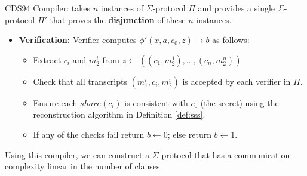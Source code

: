 \begin{protocol}[label={prot:cds-compiler}]{CDS94 Compiler: takes $n$ instances of 
    $\Sigma$-protocol $\Pi$ and provides a single $\Sigma$-protocol $\Pi'$ that proves the \textbf{disjunction} of these $n$ instances.}
\begin{itemize}
\begin{itemize}
        \end{itemize}
        \item \textbf{Verification:} Verifier computes $\phi'(x,a,c_0,z) \rightarrow b$ as follows:
        \begin{itemize}
            \item Extract $c_i$ and $m_2^i$ from $z \leftarrow ((c_1, m_2^1), \ldots, (c_n,m_2^n))$
            \item Check that all transcripts $(m_1^i, c_i, m_2^i)$ is accepted by each verifier in $\Pi$.
            \item Ensure each $share(c_i)$ is consistent with $c_0$ (the secret) using the reconstruction algorithm in Definition \ref{def:sss}.
            \item If any of the checks fail return $b \leftarrow 0$; else return $b \leftarrow 1$.
        \end{itemize}
    \end{itemize}
\end{protocol}

Using this compiler, we can construct a $\Sigma$-protocol that has a communication complexity linear in the number of clauses.